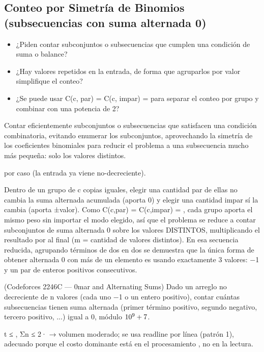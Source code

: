 \subsection{Conteo por Simetría de Binomios (subsecuencias con suma alternada 0)}
\label{alg:8-3}


\begin{itemize}
\item ¿Piden contar subconjuntos o subsecuencias que cumplen una condición de suma o balance?
\item ¿Hay valores repetidos en la entrada, de forma que agruparlos por valor simplifique el conteo?
\item ¿Se puede usar C(c, par) = C(c, impar) =  para separar el conteo por grupo y combinar con una potencia de 2?
\end{itemize}

 Contar eficientemente subconjuntos o subsecuencias que satisfacen una condición combinatoria, evitando enumerar los  subconjuntos, aprovechando la simetría de los coeficientes binomiales para reducir el problema a una subsecuencia mucho más pequeña: solo los valores distintos.

  por caso (la entrada ya viene no-decreciente).

 Dentro de un grupo de c copias iguales, elegir una cantidad par de ellas no cambia la suma alternada acumulada (aporta 0) y elegir una cantidad impar sí la cambia (aporta ±valor). Como C(c,par) = C(c,impar) = , cada grupo aporta el mismo peso sin importar el modo elegido, así que el problema se reduce a contar subconjuntos de suma alternada 0 sobre los valores DISTINTOS, multiplicando el resultado por  al final (m = cantidad de valores distintos). En esa secuencia reducida, agrupando términos de dos en dos se demuestra que la única forma de obtener alternada 0 con más de un elemento es usando exactamente 3 valores: −1 y un par de enteros positivos consecutivos.


(Codeforces 2246C — 0mar and Alternating Sums) Dado un arreglo no decreciente de n valores (cada uno −1 o un entero positivo), contar cuántas subsecuencias tienen suma alternada (primer término positivo, segundo negativo, tercero positivo, ...) igual a 0, módulo $10^{9}+7$.

 t ≤ , Σn ≤ 2· → volumen moderado; se usa readline por línea (patrón 1), adecuado porque el costo dominante está en el procesamiento , no en la lectura.


